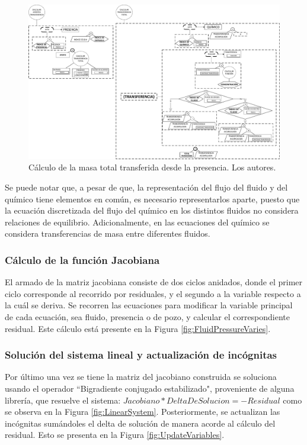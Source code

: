 \begin{figure}[h]
	\centering%
	\includegraphics[width=0.9\linewidth]{Fig/CalcularTransferencias.pdf}%
	\caption[Cálculo de la masa total transferida desde la presencia.]{Cálculo de la masa total transferida desde la presencia. Los autores.} \label{fig:ChemicalTransferences}
\end{figure}

Se puede notar que, a pesar de que, la representación del flujo del fluido y del químico tiene elementos en común, es necesario representarlos aparte, puesto que la ecuación discretizada del flujo del químico en los distintos fluidos no considera relaciones de equilibrio. Adicionalmente, en las ecuaciones del químico se considera transferencias de masa entre diferentes fluidos.

\subsubsection{Cálculo de la función Jacobiana}
El armado de la matriz jacobiana consiste de dos ciclos anidados, donde el primer ciclo corresponde al recorrido por residuales, y el segundo a la variable respecto a la cuál se deriva. Se recorren las ecuaciones para modificar la variable principal de cada ecuación, sea fluido, presencia o de pozo, y calcular el correspondiente residual. Este cálculo está presente en la Figura \ref{fig:FluidPressureVaries}.

\subsubsection{Solución del sistema lineal y actualización de incógnitas}
Por último una vez se tiene la matriz del jacobiano construida se soluciona usando el operador ``Bigradiente conjugado estabilizado", proveniente de alguna librería, que resuelve el sistema: $Jacobiano*DeltaDeSolucion = -Residual$ como se observa en la Figura \ref{fig:LinearSystem}. Posteriormente, se actualizan las incógnitas sumándoles el delta de solución de manera acorde al cálculo del residual. Esto se presenta en la Figura \ref{fig:UpdateVariables}.

